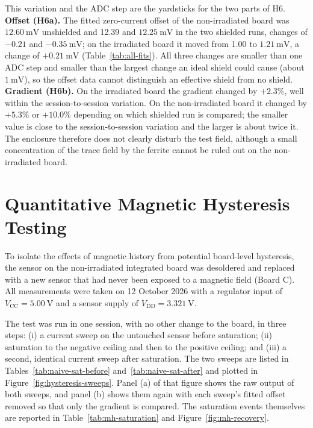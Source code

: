 \documentclass[12pt,a4paper]{article}
\begin{document}
This variation and the ADC step are the yardsticks for the two parts of H6. \textbf{Offset (H6a).} The fitted zero-current offset of the non-irradiated board was $\SI{12.60}{\milli\volt}$ unshielded and 12.39 and $\SI{12.25}{\milli\volt}$ in the two shielded runs, changes of $-0.21$ and $-\SI{0.35}{\milli\volt}$; on the irradiated board it moved from 1.00 to $\SI{1.21}{\milli\volt}$, a change of $+\SI{0.21}{\milli\volt}$ (Table~\ref{tab:all-fits}). All three changes are smaller than one ADC step and smaller than the largest change an ideal shield could cause (about $\SI{1}{\milli\volt}$), so the offset data cannot distinguish an effective shield from no shield. \textbf{Gradient (H6b).} On the irradiated board the gradient changed by $+2.3\%$, well within the session-to-session variation. On the non-irradiated board it changed by $+5.3\%$ or $+10.0\%$ depending on which shielded run is compared; the smaller value is close to the session-to-session variation and the larger is about twice it. The enclosure therefore does not clearly disturb the test field, although a small concentration of the trace field by the ferrite cannot be ruled out on the non-irradiated board.

\section{Quantitative Magnetic Hysteresis Testing}
\label{sec:hysteresis}


To isolate the effects of magnetic history from potential board-level hysteresis, the sensor on the non-irradiated integrated board was desoldered and replaced with a new sensor that had never been exposed to a magnetic field (Board C). All measurements were taken on 12 October 2026 with a regulator input of $V_{\text{CC}} = \SI{5.00}{\volt}$ and a sensor supply of $V_{\text{DD}} = \SI{3.321}{\volt}$.

The test was run in one session, with no other change to the board, in three steps: (i) a current sweep on the untouched sensor before saturation; (ii) saturation to the negative ceiling and then to the positive ceiling; and (iii) a second, identical current sweep after saturation. The two sweeps are listed in Tables~\ref{tab:naive-sat-before} and~\ref{tab:naive-sat-after} and plotted in Figure~\ref{fig:hysteresis-sweeps}. Panel (a) of that figure shows the raw output of both sweeps, and panel (b) shows them again with each sweep's fitted offset removed so that only the gradient is compared. The saturation events themselves are reported in Table~\ref{tab:mh-saturation} and Figure~\ref{fig:mh-recovery}.
\end{document}
